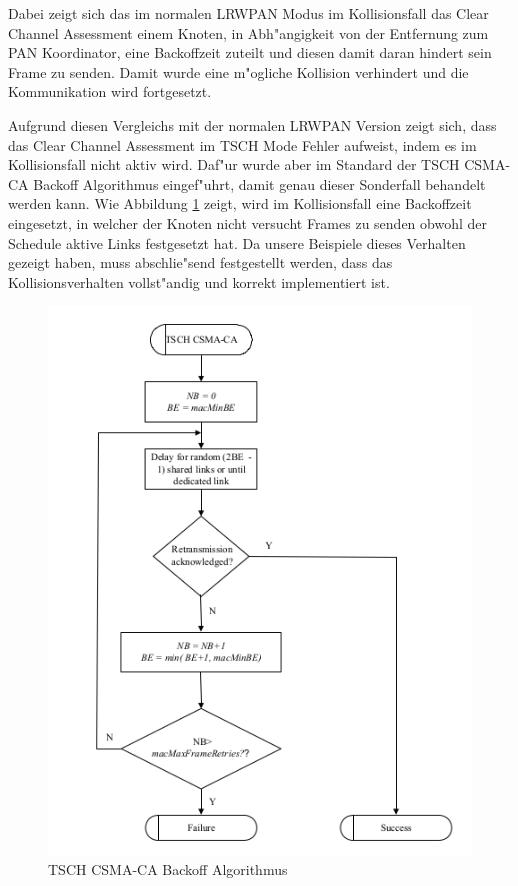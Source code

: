 Dabei zeigt sich das im normalen LRWPAN Modus im Kollisionsfall das Clear Channel
Assessment einem Knoten, in Abh"angigkeit von der Entfernung zum PAN Koordinator,
eine Backoffzeit zuteilt und diesen damit daran hindert sein Frame zu senden.
Damit wurde eine m"ogliche Kollision verhindert und die Kommunikation wird fortgesetzt.

Aufgrund diesen Vergleichs mit der normalen LRWPAN Version zeigt sich, dass das
Clear Channel Assessment im TSCH Mode Fehler aufweist, indem es im Kollisionsfall
nicht aktiv wird. Daf"ur wurde aber im Standard der TSCH CSMA-CA Backoff Algorithmus
eingef"uhrt, damit genau dieser Sonderfall behandelt werden kann. Wie Abbildung
\ref{fig:tsch_csma_backoff_algo} zeigt, wird im Kollisionsfall eine Backoffzeit
eingesetzt, in welcher der Knoten nicht versucht Frames zu senden obwohl der
Schedule aktive Links festgesetzt hat.
Da unsere Beispiele dieses Verhalten gezeigt haben, muss abschlie"send festgestellt
werden, dass das Kollisionsverhalten vollst"andig und korrekt implementiert ist.

\begin{figure}[h]
    \centering
    \includegraphics[scale=0.7]{images/tsch_csma_backoff_algo.png}
    \caption{TSCH CSMA-CA Backoff Algorithmus \cite{IEEE802154e}}
    \label{fig:tsch_csma_backoff_algo}
\end{figure}
